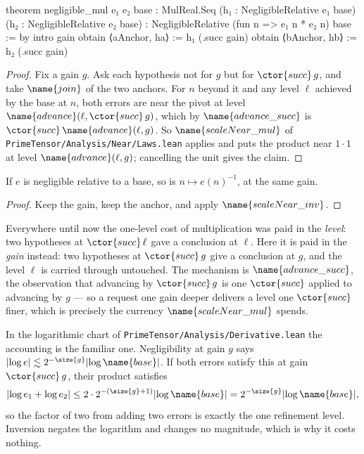 \begin{leancode}
theorem negligible_mul
    {e₁ e₂ base : MulReal.Seq}
    (h₁ : NegligibleRelative e₁ base)
    (h₂ : NegligibleRelative e₂ base) :
    NegligibleRelative (fun n => e₁ n * e₂ n) base := by
  intro gain
  obtain ⟨aAnchor, ha⟩ := h₁ (.succ gain)
  obtain ⟨bAnchor, hb⟩ := h₂ (.succ gain)
\end{leancode}

\begin{proof}
Fix a gain $g$.  Ask each hypothesis not for $g$ but for $\ctor{succ}\,g$, and
take $\name{join}$ of the two anchors.  For $n$ beyond it and any level $\ell$
achieved by the base at $n$, both errors are near the pivot at level
$\name{advance}(\ell, \ctor{succ}\,g)$, which by $\name{advance\_succ}$ is
$\ctor{succ}\,\name{advance}(\ell,g)$.  So
$\name{scaleNear\_mul}$ of
\texttt{PrimeTensor/Analysis/Near/Laws.lean} applies and puts the product near
$1 \cdot 1$ at level $\name{advance}(\ell,g)$; cancelling the unit gives the
claim.
\end{proof}

\begin{theorem}\label{Analysis:Rules:thm:negligible-inv}
If $e$ is negligible relative to a base, so is $n \mapsto e(n)^{-1}$, at the
same gain.
\end{theorem}

\begin{proof}
Keep the gain, keep the anchor, and apply $\name{scaleNear\_inv}$.
\end{proof}

\begin{designnote}
\label{Analysis:Rules:note:gain}
Everywhere until now the one-level cost of multiplication was paid in the
\emph{level}: two hypotheses at $\ctor{succ}\,\ell$ gave a conclusion at
$\ell$.  Here it is paid in the \emph{gain} instead: two hypotheses at
$\ctor{succ}\,g$ give a conclusion at $g$, and the level $\ell$ is carried
through untouched.  The mechanism is $\name{advance\_succ}$, the observation
that advancing by $\ctor{succ}\,g$ is one $\ctor{succ}$ applied to advancing by
$g$ --- so a request one gain deeper delivers a level one $\ctor{succ}$ finer,
which is precisely the currency $\name{scaleNear\_mul}$ spends.

In the logarithmic chart of
\texttt{PrimeTensor/Analysis/Derivative.lean} the accounting is the familiar
one.  Negligibility at gain $g$ says $\lvert \log e\rvert \lesssim 2^{-\size{g}}
\lvert \log \name{base}\rvert$.  If both errors satisfy this at gain
$\ctor{succ}\,g$, their product satisfies
\[
  \lvert \log e_1 + \log e_2 \rvert
    \leq 2 \cdot 2^{-(\size{g}+1)} \lvert \log \name{base}\rvert
    = 2^{-\size{g}} \lvert \log \name{base}\rvert ,
\]
so the factor of two from adding two errors is exactly the one refinement
level.  Inversion negates the logarithm and changes no magnitude, which is why
it costs nothing.
\end{designnote}

